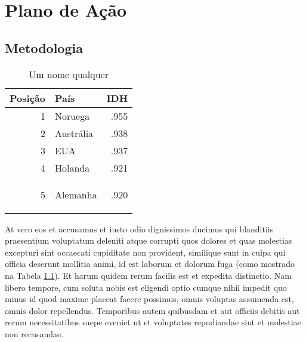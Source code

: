 %
%

\chapter{Plano de A\c{c}\~{a}o}
\lipsum[1]

\section{Metodologia}
\lipsum[11]


\begin{table}[h]
\centering
\caption{Um nome qualquer}
\vspace{0.5cm}
\begin{tabular}{r|lr}
 
Posi\c{c}\~ao & Pa\'is & IDH \\ %
\hline                               %
1 & Noruega        & .955 \\
2 & Austr{\'a}lia  & .938 \\
3 & EUA            & .937 \\
4 & Holanda        & .921 \\
5 & Alemanha       & .920            %
 
\label{tab:tabela1}
\end{tabular}
\end{table}

At vero eos et accusamus et iusto odio dignissimos ducimus qui blanditiis praesentium voluptatum deleniti atque corrupti quos dolores et quas molestias excepturi sint occaecati cupiditate non provident, similique sunt in culpa qui officia deserunt mollitia animi, id est laborum et dolorum fuga (como mostrado na Tabela \ref{tab:tabela1}). Et harum quidem rerum facilis est et expedita distinctio. Nam libero tempore, cum soluta nobis est eligendi optio cumque nihil impedit quo minus id quod maxime placeat facere possimus, omnis voluptas assumenda est, omnis dolor repellendus. Temporibus autem quibusdam et aut officiis debitis aut rerum necessitatibus saepe eveniet ut et voluptates repudiandae sint et molestiae non recusandae.

